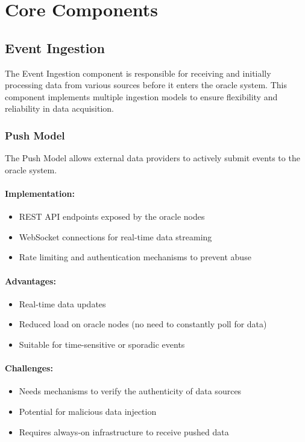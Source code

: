 \documentclass[12pt,a4paper]{article}
\begin{document}
	\section{Core Components}
	\subsection{Event Ingestion}
	The Event Ingestion component is responsible for receiving and initially processing data from various sources before it enters the oracle system. This component implements multiple ingestion models to ensure flexibility and reliability in data acquisition.
	
	\subsubsection{Push Model}
	The Push Model allows external data providers to actively submit events to the oracle system.
	
	\paragraph{Implementation:} 
	\begin{itemize}
		\item REST API endpoints exposed by the oracle nodes
		\item WebSocket connections for real-time data streaming
		\item Rate limiting and authentication mechanisms to prevent abuse
	\end{itemize}
	
	\paragraph{Advantages:}
	\begin{itemize}
		\item Real-time data updates
		\item Reduced load on oracle nodes (no need to constantly poll for data)
		\item Suitable for time-sensitive or sporadic events
	\end{itemize}
	
	\paragraph{Challenges:}
	\begin{itemize}
		\item Needs mechanisms to verify the authenticity of data sources
		\item Potential for malicious data injection
		\item Requires always-on infrastructure to receive pushed data
	\end{itemize}
	
\end{document}
